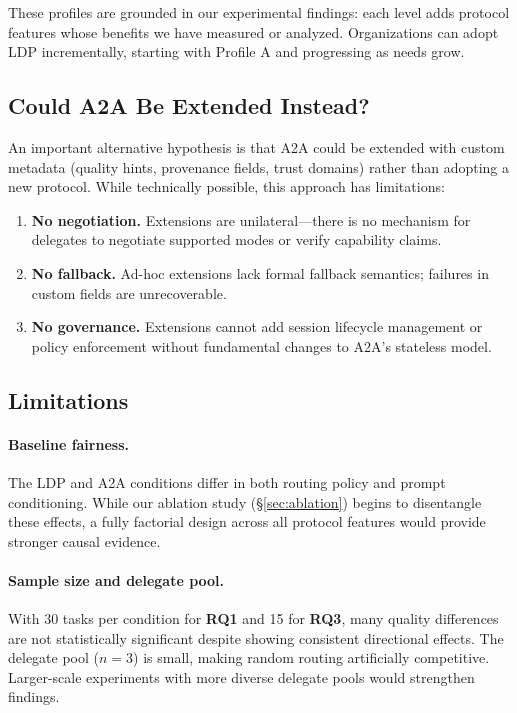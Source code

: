 \documentclass[11pt,a4paper]{article}
\newcommand{\ldp}{\textsc{LDP}}
\newcommand{\atoa}{\textsc{A2A}}
\newcommand{\RQ}[1]{\textbf{RQ#1}}
\begin{document}
\noindent These profiles are grounded in our experimental findings: each level adds protocol features whose benefits we have measured or analyzed. Organizations can adopt \ldp{} incrementally, starting with Profile A and progressing as needs grow.

\subsection{Could A2A Be Extended Instead?}
\label{sec:extend-a2a}

An important alternative hypothesis is that \atoa{} could be extended with custom metadata (quality hints, provenance fields, trust domains) rather than adopting a new protocol. While technically possible, this approach has limitations:

\begin{enumerate}[leftmargin=*]
\item \textbf{No negotiation.} Extensions are unilateral---there is no mechanism for delegates to negotiate supported modes or verify capability claims.
\item \textbf{No fallback.} Ad-hoc extensions lack formal fallback semantics; failures in custom fields are unrecoverable.
\item \textbf{No governance.} Extensions cannot add session lifecycle management or policy enforcement without fundamental changes to \atoa{}'s stateless model.
\end{enumerate}

\subsection{Limitations}

\paragraph{Baseline fairness.} The \ldp{} and \atoa{} conditions differ in both routing policy and prompt conditioning. While our ablation study (\S\ref{sec:ablation}) begins to disentangle these effects, a fully factorial design across all protocol features would provide stronger causal evidence.

\paragraph{Sample size and delegate pool.} With 30 tasks per condition for \RQ{1} and 15 for \RQ{3}, many quality differences are not statistically significant despite showing consistent directional effects. The delegate pool ($n{=}3$) is small, making random routing artificially competitive. Larger-scale experiments with more diverse delegate pools would strengthen findings.
\end{document}

